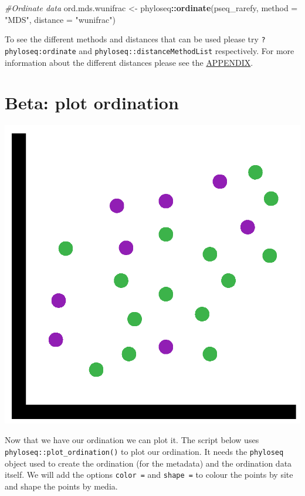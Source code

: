 \documentclass[
]{book}
\newenvironment{Shaded}{\begin{snugshade}}{\end{snugshade}}
\newcommand{\AttributeTok}[1]{\textcolor[rgb]{0.13,0.29,0.53}{#1}}
\newcommand{\CommentTok}[1]{\textcolor[rgb]{0.56,0.35,0.01}{\textit{#1}}}
\newcommand{\FunctionTok}[1]{\textcolor[rgb]{0.13,0.29,0.53}{\textbf{#1}}}
\newcommand{\NormalTok}[1]{#1}
\newcommand{\OtherTok}[1]{\textcolor[rgb]{0.56,0.35,0.01}{#1}}
\newcommand{\SpecialCharTok}[1]{\textcolor[rgb]{0.81,0.36,0.00}{\textbf{#1}}}
\newcommand{\StringTok}[1]{\textcolor[rgb]{0.31,0.60,0.02}{#1}}
\begin{document}
\begin{Shaded}
\begin{Highlighting}[]
\CommentTok{\#Ordinate data}
\NormalTok{ord.mds.wunifrac }\OtherTok{\textless{}{-}}\NormalTok{ phyloseq}\SpecialCharTok{::}\FunctionTok{ordinate}\NormalTok{(pseq\_rarefy, }\AttributeTok{method =} \StringTok{"MDS"}\NormalTok{, }\AttributeTok{distance =} \StringTok{"wunifrac"}\NormalTok{)}
\end{Highlighting}
\end{Shaded}

To see the different methods and distances that can be used please try \texttt{?phyloseq:ordinate} and \texttt{phyloseq::distanceMethodList} respectively.
For more information about the different distances please see the \protect\hyperlink{beta_appendix}{APPENDIX}.

\hypertarget{beta-plot-ordination}{%
\section{Beta: plot ordination}\label{beta-plot-ordination}}

\includegraphics{figures/Scatterplot_2.png}

Now that we have our ordination we can plot it.
The script below uses \texttt{phyloseq::plot\_ordination()} to plot our ordination.
It needs the \texttt{phyloseq} object used to create the ordination (for the metadata) and the ordination data itself.
We will add the options \texttt{color\ =} and \texttt{shape\ =} to colour the points by site and shape the points by media.
\end{document}
